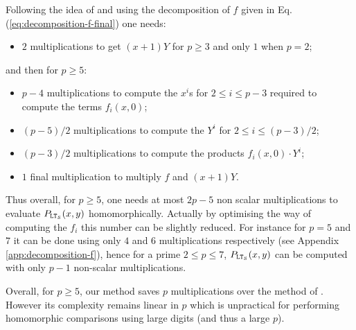 Following the idea of \cite{TLWRK20} and using the decomposition of $f$ given in Eq. (\ref{eq:decomposition-f-final}) one needs:
\begin{itemize}
\item $2$ multiplications to get $(x+1)Y$ for $p\geq 3$ and only $1$ when $p=2$;
\end{itemize}
and then for $p\geq 5$:
\begin{itemize}
\item $p-4$ multiplications to compute the $x^i$s for $2\leq i \leq p-3$ required to compute the terms $f_i(x,0)$;
\item $(p-5)/2$ multiplications to compute the $Y^i$ for $2\leq i \leq (p-3)/2$;
\item $(p-3)/2$ multiplications to compute the products $f_i(x,0)\cdot Y^i$;
\item $1$ final multiplication to multiply $f$ and $(x+1)Y$.
\end{itemize}

Thus overall, for $p\geq 5$, one needs at most $2p-5$ non scalar multiplications to evaluate $P_{\mathtt{LT}_{\mathcal{S}}}(x,y)$ homomorphically. Actually by optimising the way of computing the $f_i$ this number can be slightly reduced. For instance for $p=5$ and $7$ it can be done using only $4$ and $6$ multiplications respectively (see Appendix \ref{app:decomposition-f}), hence for a prime $2\leq p \leq 7$, $P_{\mathtt{LT}_{\mathcal{S}}}(x,y)$ can be computed with only $p-1$ non-scalar multiplications.

Overall, for $p\geq 5$, our method saves $p$ multiplications over the method of \cite{TLWRK20}. However its complexity remains linear in $p$ which is unpractical for performing homomorphic comparisons using large digits (and thus a large $p$).
  
